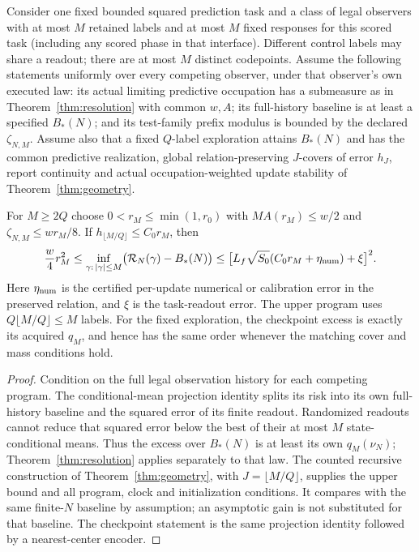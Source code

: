 \begin{corollary}\label{cor:resolution-memory}
Consider one fixed bounded squared prediction task and a class of legal observers with at most $M$ retained labels and at most $M$ fixed responses for this scored task (including any scored phase in that interface). Different control labels may share a readout; there are at most $M$ distinct codepoints. Assume the following statements uniformly over every competing observer, under that observer's own executed law: its actual limiting predictive occupation has a submeasure as in Theorem~\ref{thm:resolution} with common $w,A$; its full-history baseline is at least a specified $B_*(N)$; and its test-family prefix modulus is bounded by the declared $\zeta_{N,M}$. Assume also that a fixed $Q$-label exploration attains $B_*(N)$ and has the common predictive realization, global relation-preserving $J$-covers of error $h_J$, report continuity and actual occupation-weighted update stability of Theorem~\ref{thm:geometry}.

For $M\ge2Q$ choose $0<r_M\le\min(1,r_0)$ with $M A(r_M)\le w/2$ and $\zeta_{N,M}\le wr_M/8$. If $h_{\lfloor M/Q\rfloor}\le C_0r_M$, then
\begin{equation}\label{eq:resolution-memory}
 \frac w4r_M^2\le
 \inf_{\gamma:\,|\gamma|\le M}\bigl(\mathcal R_N(\gamma)-B_*(N)\bigr)
 \le\bigl[L_f\sqrt{S_0}(C_0r_M+\eta_{\rm num})+\xi\bigr]^2.
\end{equation}
Here $\eta_{\rm num}$ is the certified per-update numerical or calibration error in the preserved relation, and $\xi$ is the task-readout error. The upper program uses $Q\lfloor M/Q\rfloor\le M$ labels. For the fixed exploration, the checkpoint excess is exactly its acquired $q_M$, and hence has the same order whenever the matching cover and mass conditions hold.
\end{corollary}
\begin{proof}
Condition on the full legal observation history for each competing program. The conditional-mean projection identity splits its risk into its own full-history baseline and the squared error of its finite readout. Randomized readouts cannot reduce that squared error below the best of their at most $M$ state-conditional means. Thus the excess over $B_*(N)$ is at least its own $q_M(\nu_N)$; Theorem~\ref{thm:resolution} applies separately to that law. The counted recursive construction of Theorem~\ref{thm:geometry}, with $J=\lfloor M/Q\rfloor$, supplies the upper bound and all program, clock and initialization conditions. It compares with the same finite-$N$ baseline by assumption; an asymptotic gain is not substituted for that baseline. The checkpoint statement is the same projection identity followed by a nearest-center encoder.
\end{proof}
